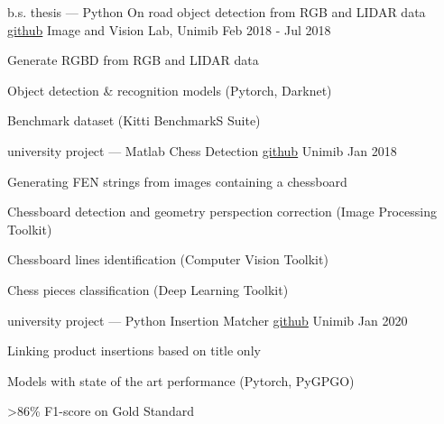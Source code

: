 

\begin{cventries}

  \cventry
    {b.s. thesis --- Python} %
    {On road object detection from RGB and LIDAR data \tiny \href{https://github.com/gianscarpe/bachelor_thesis}{github}} %
    {Image and Vision Lab, Unimib} %
    {Feb 2018 - Jul 2018} %
    {
      \begin{cvitems} %
		\item Generate RGBD from RGB and LIDAR data
		\item Object detection \& recognition models (Pytorch, Darknet)
		\item Benchmark dataset (Kitti BenchmarkS Suite)
      \end{cvitems}
    }

\cventry
    {university project --- Matlab}
    {Chess Detection \tiny \href{https://github.com/gianscarpe/chess_detection}{github}}
    {Unimib}
    {Jan 2018}
    {
      \begin{cvitems} %
        \item Generating FEN strings from images containing a chessboard
        \item Chessboard detection and geometry perspection correction (Image Processing Toolkit)
        \item Chessboard lines identification (Computer Vision Toolkit)
        \item Chess pieces classification (Deep Learning Toolkit)
      \end{cvitems}
    }



\cventry
{university project --- Python}
{Insertion Matcher \tiny \href{https://github.com/belerico/insertion-matcher}{github}}
{Unimib}
{Jan 2020}
{
	\begin{cvitems} %
		\item Linking product insertions based on title only
		\item Models with state of the art performance  (Pytorch, PyGPGO)
		\item >86\% F1-score on Gold Standard
	\end{cvitems}
}
    
\end{cventries}


